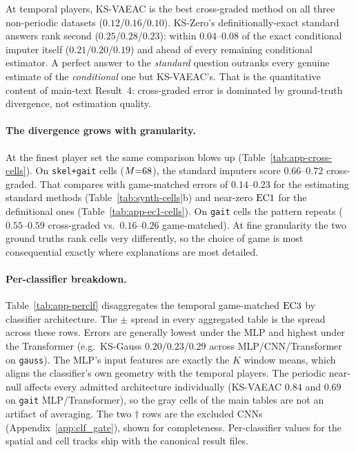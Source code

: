 



At temporal players, KS-VAEAC is the best cross-graded method on all three
non-periodic datasets ($0.12$/$0.16$/$0.10$).  KS-Zero's definitionally-exact
standard answers rank second ($0.25$/$0.28$/$0.23$): within $0.04$--$0.08$
of the exact conditional imputer itself ($0.21$/$0.20$/$0.19$) and ahead of
every remaining conditional estimator.  A perfect answer to the
\emph{standard} question outranks every genuine estimate of the
\emph{conditional} one but KS-VAEAC's.  That is the quantitative content of
main-text Result~4: cross-graded error is dominated by ground-truth
divergence, not estimation quality.

\paragraph{The divergence grows with granularity.}
At the finest player set the same comparison blows up
(Table~\ref{tab:app-cross-cells}).  On \texttt{skel+gait} cells
($M{=}68$), the standard imputers score $0.66$--$0.72$ cross-graded.  That
compares with game-matched errors of $0.14$--$0.23$ for the estimating
standard methods (Table~\ref{tab:synth-cells}b) and near-zero $\mathrm{EC1}$ for
the definitional ones (Table~\ref{tab:app-ec1-cells}).  On \texttt{gait}
cells the pattern repeats ($0.55$--$0.59$ cross-graded vs.\ $0.16$--$0.26$
game-matched).  At fine granularity the two ground truths rank cells very
differently, so the choice of game is most consequential exactly where
explanations are most detailed.

\paragraph{Per-classifier breakdown.}
Table~\ref{tab:app-perclf} disaggregates the temporal game-matched
$\mathrm{EC3}$ by classifier architecture.  The $\pm$ spread in every aggregated
table is the spread across these rows.  Errors are generally lowest under
the MLP and highest under the Transformer (e.g.\ KS-Gauss
$0.20$/$0.23$/$0.29$ across MLP/CNN/Transformer on \texttt{gauss}).  The
MLP's input features are exactly the $K$ window means, which aligns the
classifier's own geometry with the temporal players.  The periodic near-null
affects every admitted architecture individually (KS-VAEAC $0.84$ and
$0.69$ on \texttt{gait} MLP/Transformer), so the gray cells of the main
tables are not an artifact of averaging.  The two $\dagger$ rows are the
excluded CNNs (Appendix~\ref{app:clf_gate}), shown for completeness.
Per-classifier values for the spatial and cell tracks ship with the
canonical result files.


